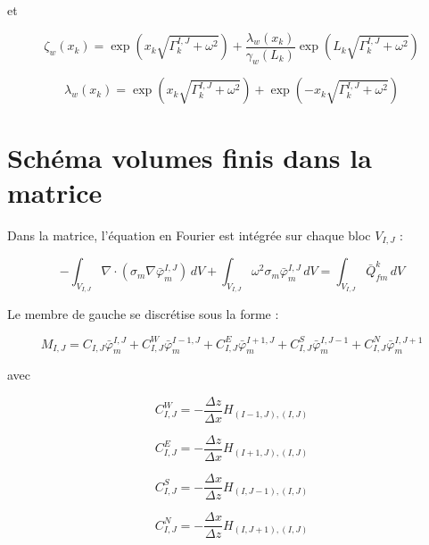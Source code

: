 et

\begin{equation}
\zeta_w(x_k)=\exp\left(x_k\sqrt{\Gamma_k^{I,J}+\omega^2}\right)+\frac{\lambda_w(x_k)}{\gamma_w(L_k)}\exp\left(L_k\sqrt{\Gamma_k^{I,J}+\omega^2}\right)
\end{equation}

\begin{equation}
\lambda_w(x_k)=\exp\left(x_k\sqrt{\Gamma_k^{I,J}+\omega^2}\right)+\exp\left(-x_k\sqrt{\Gamma_k^{I,J}+\omega^2}\right)
\end{equation}

\section{Schéma volumes finis dans la matrice}

Dans la matrice, l'équation en Fourier est intégrée sur chaque bloc $V_{I,J}$ :

\begin{equation}
-\int_{V_{I,J}} \nabla\cdot\left(\sigma_m\nabla \bar{\varphi}_m^{I,J}\right)\,dV+\int_{V_{I,J}}\omega^2\sigma_m\bar{\varphi}_m^{I,J}\,dV=\int_{V_{I,J}} \bar{Q}_{fm}^k\,dV
\end{equation}

Le membre de gauche se discrétise sous la forme :

\begin{equation}
M_{I,J}=C_{I,J}\bar{\varphi}_m^{I,J}+C_{I,J}^W\bar{\varphi}_m^{I-1,J}+C_{I,J}^E\bar{\varphi}_m^{I+1,J}
+C_{I,J}^S\bar{\varphi}_m^{I,J-1}+C_{I,J}^N\bar{\varphi}_m^{I,J+1}
\end{equation}

avec

\begin{equation}
C_{I,J}^W=-\frac{\Delta z}{\Delta x}H_{(I-1,J),(I,J)}
\end{equation}

\begin{equation}
C_{I,J}^E=-\frac{\Delta z}{\Delta x}H_{(I+1,J),(I,J)}
\end{equation}

\begin{equation}
C_{I,J}^S=-\frac{\Delta x}{\Delta z}H_{(I,J-1),(I,J)}
\end{equation}

\begin{equation}
C_{I,J}^N=-\frac{\Delta x}{\Delta z}H_{(I,J+1),(I,J)}
\end{equation}

